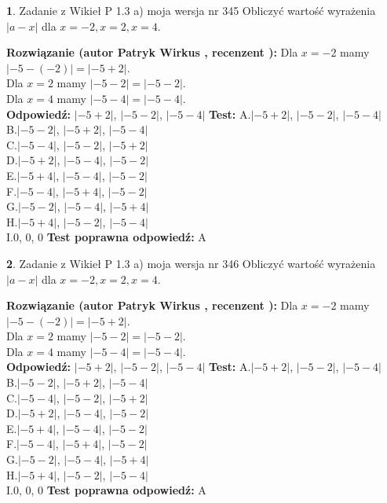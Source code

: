 \documentclass[12pt, a4paper]{article}
\theoremstyle{definition} %
\newtheorem{zad}{}
\newcommand{\zadStart}[1]{\begin{zad}#1\newline}
\newcommand{\zadStop}{\end{zad}}
\newcommand{\rozwStart}[2]{\noindent \textbf{Rozwiązanie (autor #1 , recenzent #2): }\newline}
\newcommand{\rozwStop}{\newline}
\newcommand{\odpStart}{\noindent \textbf{Odpowiedź:}\newline}
\newcommand{\odpStop}{\newline}
\newcommand{\testStart}{\noindent \textbf{Test:}\newline}
\newcommand{\testStop}{\newline}
\newcommand{\kluczStart}{\noindent \textbf{Test poprawna odpowiedź:}\newline}
\newcommand{\kluczStop}{\newline}
\begin{document}
\zadStart{Zadanie z Wikieł P 1.3 a) moja wersja nr 345}
Obliczyć wartość wyrażenia $|a - x|$ dla $x=-2,x=2,x=4$.
\zadStop
\rozwStart{Patryk Wirkus}{}
Dla $x = -2$ mamy $|-5 - (-2)| = |-5 + 2|$.\\
Dla $x = 2$ mamy $|-5 - 2| = |-5 - 2|$.\\
Dla $x = 4$ mamy $|-5 - 4| = |-5 - 4|$.\\
\rozwStop
\odpStart
$|-5 + 2|$, $|-5 - 2|$, $|-5 - 4|$
\odpStop
\testStart
A.$|-5 + 2|$, $|-5 - 2|$, $|-5 - 4|$\\
B.$|-5 - 2|$, $|-5 + 2|$, $|-5 - 4|$\\
C.$|-5 - 4|$, $|-5 - 2|$, $|-5 + 2|$\\
D.$|-5 + 2|$, $|-5 - 4|$, $|-5 - 2|$\\
E.$|-5 + 4|$, $|-5 - 4|$, $|-5 - 2|$\\
F.$|-5 - 4|$, $|-5 + 4|$, $|-5 - 2|$\\
G.$|-5 - 2|$, $|-5 - 4|$, $|-5 + 4|$\\
H.$|-5 + 4|$, $|-5 - 2|$, $|-5 - 4|$\\
I.$0$, $0$, $0$
\testStop
\kluczStart
A
\kluczStop



\zadStart{Zadanie z Wikieł P 1.3 a) moja wersja nr 346}
Obliczyć wartość wyrażenia $|a - x|$ dla $x=-2,x=2,x=4$.
\zadStop
\rozwStart{Patryk Wirkus}{}
Dla $x = -2$ mamy $|-5 - (-2)| = |-5 + 2|$.\\
Dla $x = 2$ mamy $|-5 - 2| = |-5 - 2|$.\\
Dla $x = 4$ mamy $|-5 - 4| = |-5 - 4|$.\\
\rozwStop
\odpStart
$|-5 + 2|$, $|-5 - 2|$, $|-5 - 4|$
\odpStop
\testStart
A.$|-5 + 2|$, $|-5 - 2|$, $|-5 - 4|$\\
B.$|-5 - 2|$, $|-5 + 2|$, $|-5 - 4|$\\
C.$|-5 - 4|$, $|-5 - 2|$, $|-5 + 2|$\\
D.$|-5 + 2|$, $|-5 - 4|$, $|-5 - 2|$\\
E.$|-5 + 4|$, $|-5 - 4|$, $|-5 - 2|$\\
F.$|-5 - 4|$, $|-5 + 4|$, $|-5 - 2|$\\
G.$|-5 - 2|$, $|-5 - 4|$, $|-5 + 4|$\\
H.$|-5 + 4|$, $|-5 - 2|$, $|-5 - 4|$\\
I.$0$, $0$, $0$
\testStop
\kluczStart
A
\kluczStop
\end{document}
